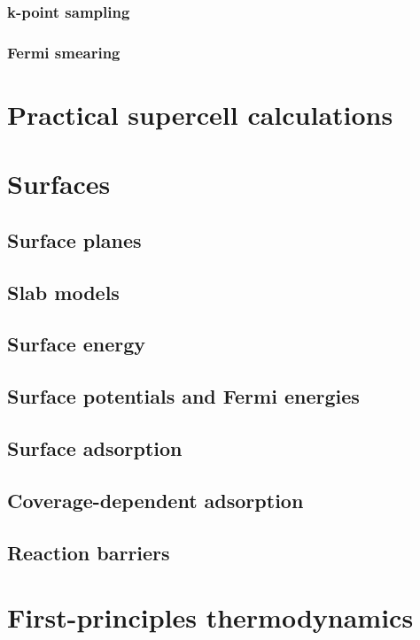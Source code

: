 \documentclass[11pt]{article}
\begin{document}
\subsubsection{k-point sampling}
\label{sec:orgfd8b3cd}
\subsubsection{Fermi smearing}
\label{sec:org49bb7db}
\newpage
\section{Practical supercell calculations}
\label{sec:orgca86d15}
\newpage
\section{Surfaces}
\label{sec:org7d8891b}
\subsection{Surface planes}
\label{sec:orgef8923d}
\subsection{Slab models}
\label{sec:org9c40b48}
\subsection{Surface energy}
\label{sec:org5224619}
\subsection{Surface potentials and Fermi energies}
\label{sec:orgd96b6d8}
\subsection{Surface adsorption}
\label{sec:org3619cd0}
\subsection{Coverage-dependent adsorption}
\label{sec:org6b8508a}
\subsection{Reaction barriers}
\label{sec:org81cf72d}

\newpage
\section{First-principles thermodynamics}
\label{sec:orgf2a1476}
\end{document}
